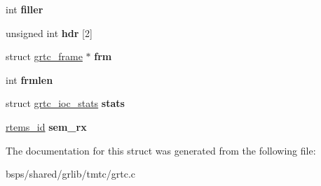\begin{DoxyCompactItemize}
\item 
\mbox{\label{structgrtc__priv_a3b3df8de676740a0e28f933a3e1d8246}} 
int {\bfseries filler}
\item 
\mbox{\label{structgrtc__priv_af857d211ccf55fe860336cc57e133283}} 
unsigned int {\bfseries hdr} \mbox{[}2\mbox{]}
\item 
\mbox{\label{structgrtc__priv_a1d482dffc9f3bd2ae969a9aa2eb04677}} 
struct \mbox{\hyperlink{structgrtc__frame}{grtc\+\_\+frame}} $\ast$ {\bfseries frm}
\item 
\mbox{\label{structgrtc__priv_a2c7f175e0849146f00907ecef2c7f153}} 
int {\bfseries frmlen}
\item 
\mbox{\label{structgrtc__priv_a99774df07c8039c4b164c66842692128}} 
struct \mbox{\hyperlink{structgrtc__ioc__stats}{grtc\+\_\+ioc\+\_\+stats}} {\bfseries stats}
\item 
\mbox{\label{structgrtc__priv_a332c71cef273ca5c8c7e27feb8a7e7c1}} 
\mbox{\hyperlink{group__ClassicTasks_gab20892b814dced7dd4e5b9bf42becd57}{rtems\+\_\+id}} {\bfseries sem\+\_\+rx}
\end{DoxyCompactItemize}


The documentation for this struct was generated from the following file\+:\begin{DoxyCompactItemize}
\item 
bsps/shared/grlib/tmtc/grtc.\+c\end{DoxyCompactItemize}
